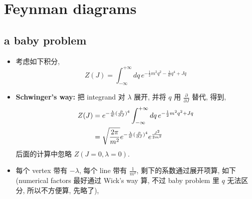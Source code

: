\chapter{Feynman diagrams}
\section{a baby problem}
\begin{itemize}
	\item 考虑如下积分,
	\begin{equation} \label{3.1.1}
		Z(J) = \int_{- \infty}^{+ \infty} dq \, e^{- \frac{1}{2} m^2 q^2 - \frac{\lambda}{4!} q^4 + J q}
	\end{equation}
	
	\item \textbf{Schwinger's way:} 把 integrand 对 $\lambda$ 展开, 并将 $q$ 用 $\frac{\partial}{\partial J}$ 替代, 得到,
	\begin{align}
		Z(J) &= e^{- \frac{\lambda}{4!} (\frac{\partial}{\partial J})^4} \int_{- \infty}^{+ \infty} dq \, e^{- \frac{1}{2} m^2 q^2 + J q} \notag \\
		&= \sqrt{\frac{2 \pi}{m^2}} e^{- \frac{\lambda}{4!} (\frac{\partial}{\partial J})^4} e^{\frac{J^2}{2 m^2}} \label{3.1.2}
	\end{align}
	后面的计算中忽略 $Z(J = 0, \lambda = 0)$.
	
	\item 每个 vertex 带有 $- \lambda$, 每个 line 带有 $\frac{1}{m^2}$, 剩下的系数通过展开项算, 如下 (numerical factors 最好通过 Wick's way 算, 不过 baby problem 里 $q$ 无法区分, 所以不方便算, 先略了),
	

\end{itemize}
